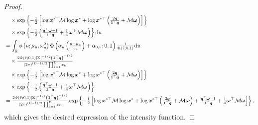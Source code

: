 \documentclass[12pt]{article}
\begin{document}
\begin{proof}
\begin{align*}
&\quad \times \exp \left\{ -{\textstyle{1\over2}} \left[ \log \bm x^{*\top} {\mathcal M} \log \bm x^* + \log \bm x^{*\top} \left( {\textstyle{2 \bm q\over\bm 1^\top \bm q}} + {\mathcal M}\bm\omega\right) \right]\right\} \\
& \quad \times \exp \left\{- {\textstyle{1\over2}} \left( {\textstyle{\bm q^\top\bm\omega - 1\over\bm 1 ^\top \bm q}} + {\textstyle{1\over4}}\bm\omega^\top{\mathcal M}\bm\omega\right) \right\} \text du   \\
&=  \int_{\mathbb R} \phi \left( u; \mu_u, \omega_u^2 \right) \Phi\left( \alpha_u\left({\textstyle{u-\mu_u\over\omega_u}}\right) + \alpha_{0,u};0,1\right){\textstyle{1\over\Phi(\tilde{\tau};0,1)}} \text du \\
&\quad\times {\textstyle{2\Phi(\tilde{\tau};0,1)| \Sigma |^{-1/2} \left( \bm 1^\top \bm q\right)^{-1/2}\over\left( 2\pi \right)^{(D-1)/2}\prod_{k=1}^Dx_k}} \\
&\quad \times \exp \left\{ -{\textstyle{1\over2}} \left[ \log \bm x^{*\top} {\mathcal M} \log \bm x^* + \log \bm x^{*\top} \left( {\textstyle{2 \bm q\over\bm 1^\top \bm q}} + {\mathcal M}\bm\omega\right) \right]\right\} \\
& \quad \times \exp \left\{- {\textstyle{1\over2}} \left( {\textstyle{\bm q^\top\bm\omega - 1\over\bm 1 ^\top \bm q}} + {\textstyle{1\over4}}\bm\omega^\top{\mathcal M}\bm\omega\right) \right\} \\
&={\textstyle{2\Phi(\tilde{\tau};0,1)| \Sigma |^{-1/2} \left( \bm 1^\top \bm q\right)^{-1/2}\over\left( 2\pi \right)^{(D-1)/2}\prod_{k=1}^Dx_k}}\exp \left\{ -{\textstyle{1\over2}} \left[ \log \bm x^{*\top} {\mathcal M} \log \bm x^* + \log \bm x^{*\top} \left( {\textstyle{2 \bm q\over\bm 1^\top \bm q}}+{\mathcal M}\bm\omega\right) + {\textstyle{\bm q^\top\bm\omega - 1\over\bm 1 ^\top \bm q }} + {\textstyle{1\over4}}\bm\omega^\top{\mathcal M}\bm\omega \right]\right\},
\end{align*}
which gives the desired expression of the intensity function. 
% 
\end{proof}


\end{document}
